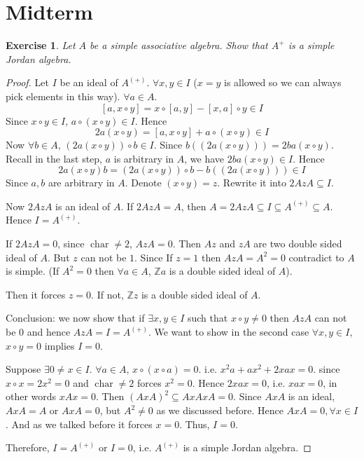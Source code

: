 \documentclass{article}
\newtheorem{exercise}[theorem]{Exercise}
\begin{document}
\section{Midterm}

\begin{exercise}
Let $A$ be a simple associative algebra. Show that $A^+$ is a simple Jordan algebra.  
\end{exercise}

\begin{proof} 
Let $ I $ be an ideal of $ A^{(+)} $. $\forall x,y \in I $ ($ x=y $ is allowed so we can always pick elements in this way). $ \forall a \in A $. 
\[
[a,x\circ y ]=x \circ[a,y]-[x,a] \circ y \in I
\]  
Since $ x \circ y \in I $, $ a \circ(x \circ y) \in I $. Hence 
\[
2a(x \circ y)=[a,x\circ y ]+a \circ(x \circ y) \in I
\] 
Now $ \forall b \in A$, $ (2a(x \circ y)) \circ b \in I$. Since $ b((2a(x \circ y))) =2ba (x \circ y) $. Recall in the last step, $ a $ is arbitrary in $ A $, we have $2ba (x \circ y)\in I  $. Hence 
\[
2a(x \circ y)b=(2a(x \circ y)) \circ b- b((2a(x \circ y))) \in I
\] 
Since $ a,b $ are arbitrary in $ A $. Denote $ (x \circ y)=z $. Rewrite it into $ 2Az A \subseteq I $.   

Now $ 2AzA $ is an ideal of $ A $. If $ 2AzA =A $, then $ A =2AzA \subseteq I \subseteq A^{(+)} \subseteq A $.  Hence $ I=A^{(+)} $. 

If $ 2AzA =0 $, since $ \operatorname{char} \neq 2 $, $ AzA=0 $. Then $ Az $ and $ zA $ are two double sided ideal of $ A $. But $ z $ can not be $ 1 $. Since If $ z=1 $ then $ AzA=A^2=0 $ contradict to $ A $ is simple. (If $ A^2 =0$ then $ \forall a \in A $, $ \mathbb{Z}a $ is a double sided ideal of $ A $). 

Then it forces $ z=0 $. If not, $ \mathbb{Z} z$ is a double sided ideal of $ A $. 

Conclusion: we now show that if $ \exists x,y \in I $ such that $ x \circ y \neq 0 $ then $ AzA $ can not be $ 0 $ and hence $ AzA=I=A^{(+)} $. We want to show in the second case $ \forall x,y \in I $, $ x \circ y =0 $ implies $ I=0 $.

Suppose $ \exists 0 \neq x \in I $. $ \forall a \in A $, $ x\circ (x \circ a)=0 $. i.e. $ x^2a+ax^2+2xax=0 $. since $ x\circ x=2x^2=0 $ and $ \operatorname{char} \neq 2 $ forces $ x^2 = 0 $. Hence $ 2xax=0 $, i.e. $ xax=0 $, in other words $ xAx=0 $. Then $ (AxA)^2 \subseteq AxAxA=0 $. Since $ AxA $ is an ideal, $ AxA=A $ or $ AxA=0 $, but $ A^2 \neq 0 $ as we discussed before. Hence $ AxA=0 , \forall x \in I$. And as we talked before it forces $ x =0$. Thus, $ I=0 $.

Therefore, $ I=A^{(+)} $ or $ I=0 $, i.e. $ A^{(+)} $ is a simple Jordan algebra.   
\end{proof}
\end{document}
